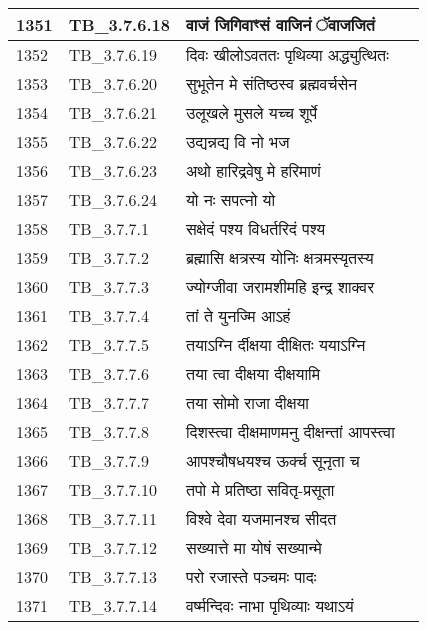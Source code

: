 \documentclass[17pt]{extarticle}
\begin{document}
\begin{longtable}{||p{0.4in}||p{0.9in}||p{4.0in}||p{0.9in}||}
        \hline
            1351 & TB\_3.7.6.18 & वाजं जिगिवाꣳसं वाजिनं ॅवाजजितं &      \\
        \hline
            1352 & TB\_3.7.6.19 & दिवः खीलोऽवततः पृथिव्या अद्ध्युत्थितः &      \\
        \hline
            1353 & TB\_3.7.6.20 & सुभूतेन मे संतिष्ठस्व ब्रह्मवर्चसेन &      \\
        \hline
            1354 & TB\_3.7.6.21 & उलूखले मुसले यच्च शूर्पे &      \\
        \hline
            1355 & TB\_3.7.6.22 & उद्यन्नद्य वि नो भज &      \\
        \hline
            1356 & TB\_3.7.6.23 & अथो हारिद्रवेषु मे हरिमाणं &      \\
        \hline
            1357 & TB\_3.7.6.24 & यो नः सपत्नो यो &      \\
        \hline
            1358 & TB\_3.7.7.1 & सक्षेदं पश्य विधर्तरिदं पश्य &      \\
        \hline
            1359 & TB\_3.7.7.2 & ब्रह्मासि क्षत्रस्य योनिः क्षत्रमस्यृतस्य &      \\
        \hline
            1360 & TB\_3.7.7.3 & ज्योग्जीवा जरामशीमहि इन्द्र शाक्वर &      \\
        \hline
            1361 & TB\_3.7.7.4 & तां ते युनज्मि आऽहं &      \\
        \hline
            1362 & TB\_3.7.7.5 & तयाऽग्नि र्दीक्षया दीक्षितः ययाऽग्नि &      \\
        \hline
            1363 & TB\_3.7.7.6 & तया त्वा दीक्षया दीक्षयामि &      \\
        \hline
            1364 & TB\_3.7.7.7 & तया सोमो राजा दीक्षया &      \\
        \hline
            1365 & TB\_3.7.7.8 & दिशस्त्वा दीक्षमाणमनु दीक्षन्तां आपस्त्वा &      \\
        \hline
            1366 & TB\_3.7.7.9 & आपश्चौषधयश्च ऊर्क्च सूनृता च &      \\
        \hline
            1367 & TB\_3.7.7.10 & तपो मे प्रतिष्ठा सवितृ{-}प्रसूता &      \\
        \hline
            1368 & TB\_3.7.7.11 & विश्वे देवा यजमानश्च सीदत &      \\
        \hline
            1369 & TB\_3.7.7.12 & सख्यात्ते मा योषं सख्यान्मे &      \\
        \hline
            1370 & TB\_3.7.7.13 & परो रजास्ते पञ्चमः पादः &      \\
        \hline
            1371 & TB\_3.7.7.14 & वर्ष्मन्दिवः नाभा पृथिव्याः यथाऽयं &      \\

\end{longtable}
\end{document}
